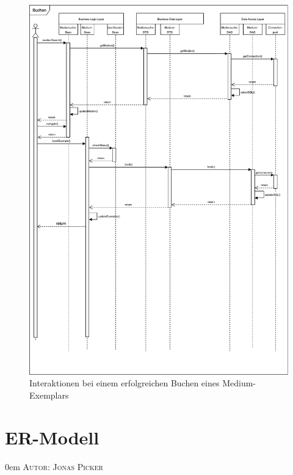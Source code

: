 \documentclass{article}
\makeatletter
\newcommand{\sectionauthor}[1]{
	{\parindent 0em \large \scshape Autor: #1 \par \nobreak \vspace*{1em}}
	\@afterheading
}
\makeatother
\begin{document}
\newpage
{}

\begin{figure}[h]
    \centering
    \includegraphics[width = 45em]{Sequenzdiagramm-2}
    \caption{Interaktionen bei einem erfolgreichen Buchen eines Medium-Exemplars}
    \label{Sequenzdiagramm}
\end{figure}

\restoregeometry
\newpage

\section{ER-Modell}
\sectionauthor{Jonas Picker}
\end{document}
